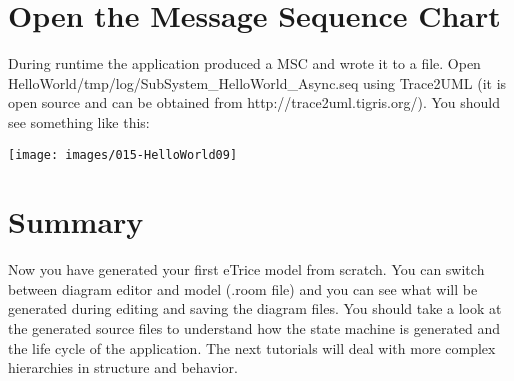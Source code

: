 \section{Open the Message Sequence Chart}

During runtime the application produced a MSC and wrote it to a file. Open HelloWorld/tmp/log/SubSystem\_HelloWorld\_Async.seq using Trace2UML (it is open source and can be obtained from  http://trace2uml.tigris.org/). You should see something like this:

\texttt{[image: images/015-HelloWorld09]}


\section{Summary}

Now you have generated your first eTrice model from scratch. You can switch between diagram editor and model (.room file) and you can see what will be generated during editing and saving the diagram files. 
You should take a look at the generated source files to understand how the state machine is generated and the life cycle of the application. The next tutorials will deal with more complex hierarchies in structure and behavior.
 